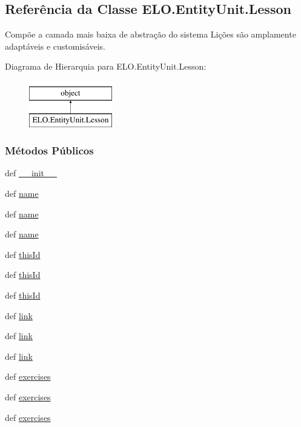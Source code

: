 \hypertarget{classELO_1_1EntityUnit_1_1Lesson}{\subsection{Referência da Classe E\-L\-O.\-Entity\-Unit.\-Lesson}
\label{classELO_1_1EntityUnit_1_1Lesson}
}


Compõe a camada mais baixa de abstração do sistema Lições são amplamente adaptáveis e customisáveis.  


Diagrama de Hierarquia para E\-L\-O.\-Entity\-Unit.\-Lesson\-:\begin{figure}[H]
\begin{center}
\leavevmode
\includegraphics[height=2.000000cm]{dc/d13/classELO_1_1EntityUnit_1_1Lesson}
\end{center}
\end{figure}
\subsubsection*{Métodos Públicos}
\begin{DoxyCompactItemize}
\item 
def \hyperlink{classELO_1_1EntityUnit_1_1Lesson_a263c8aacf2bb8a0489283177c0091a67}{\-\_\-\-\_\-init\-\_\-\-\_\-}
\item 
def \hyperlink{classELO_1_1EntityUnit_1_1Lesson_a5af62a54f008a391543fd8fabf30edcf}{name}
\item 
def \hyperlink{classELO_1_1EntityUnit_1_1Lesson_a5af62a54f008a391543fd8fabf30edcf}{name}
\item 
def \hyperlink{classELO_1_1EntityUnit_1_1Lesson_a5af62a54f008a391543fd8fabf30edcf}{name}
\item 
def \hyperlink{classELO_1_1EntityUnit_1_1Lesson_a1947d2d6413e7e94c8c524efe271af12}{this\-Id}
\item 
def \hyperlink{classELO_1_1EntityUnit_1_1Lesson_a1947d2d6413e7e94c8c524efe271af12}{this\-Id}
\item 
def \hyperlink{classELO_1_1EntityUnit_1_1Lesson_a1947d2d6413e7e94c8c524efe271af12}{this\-Id}
\item 
def \hyperlink{classELO_1_1EntityUnit_1_1Lesson_a8560623b79e4379c2ba74aaf678a4764}{link}
\item 
def \hyperlink{classELO_1_1EntityUnit_1_1Lesson_a8560623b79e4379c2ba74aaf678a4764}{link}
\item 
def \hyperlink{classELO_1_1EntityUnit_1_1Lesson_a8560623b79e4379c2ba74aaf678a4764}{link}
\item 
def \hyperlink{classELO_1_1EntityUnit_1_1Lesson_a49ad3f9952188497a01afdd31db8000c}{exercises}
\item 
def \hyperlink{classELO_1_1EntityUnit_1_1Lesson_a49ad3f9952188497a01afdd31db8000c}{exercises}
\item 
def \hyperlink{classELO_1_1EntityUnit_1_1Lesson_a49ad3f9952188497a01afdd31db8000c}{exercises}
\end{DoxyCompactItemize}
